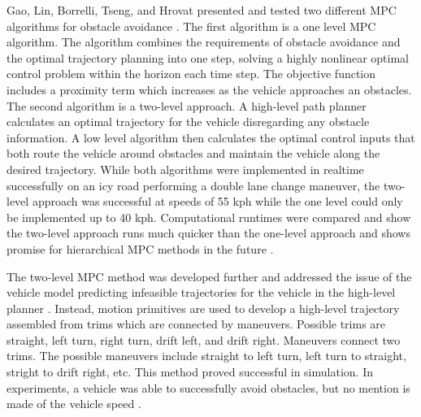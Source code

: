 \documentclass[12pt,onecolumn]{report}
\begin{document}
Gao, Lin, Borrelli, Tseng, and Hrovat presented and tested two different MPC algorithms for obstacle avoidance \cite{Gao&Borrelli2010}. The first algorithm is a one level MPC algorithm. The algorithm combines the requirements of obstacle avoidance and the optimal trajectory planning into one step, solving a highly nonlinear optimal control problem within the horizon each time step. The objective function includes a proximity term which increases as the vehicle approaches an obstacles. The second algorithm is a two-level approach. A high-level path planner calculates an optimal trajectory for the vehicle disregarding any obstacle information. A low level algorithm then calculates the optimal control inputs that both route the vehicle around obstacles and maintain the vehicle along the desired trajectory. While both algorithms were implemented in realtime successfully on an icy road performing a double lane change maneuver, the two-level approach was successful at speeds of 55 kph while the one level could only be implemented up to 40 kph. Computational runtimes were compared and show the two-level approach runs much quicker than the one-level approach and shows promise for hierarchical MPC methods in the future \cite{Gao&Borrelli2010}.

The two-level MPC method was developed further and addressed the issue of the vehicle model predicting infeasible trajectories for the vehicle in the high-level planner \cite{Gray&Gao2012}. Instead, motion primitives are used to develop a high-level trajectory assembled from trims which are connected by maneuvers. Possible trims are straight, left turn, right turn, drift left, and drift right. Maneuvers connect two trims. The possible maneuvers include straight to left turn, left turn to straight, stright to drift right, etc. This method proved successful in simulation. In experiments, a vehicle was able to successfully avoid obstacles, but no mention is made of the vehicle speed \cite{Gray&Gao2012}.
\end{document}
